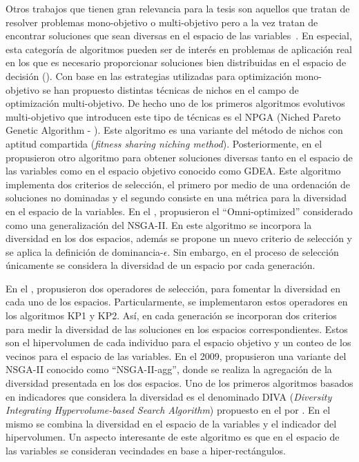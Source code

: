 Otros trabajos que tienen gran relevancia para la tesis son aquellos que tratan de resolver problemas mono-objetivo o multi-objetivo 
pero a la vez tratan de encontrar soluciones que sean diversas en el espacio de las variables~\cite{preuss2006pareto}.
%
En especial, esta categoría de algoritmos pueden ser de interés en problemas de aplicación real en los que es necesario 
proporcionar soluciones bien distribuidas en el espacio de decisión (\cite{deb2005omni, rudolph2007capabilities}).
%
Con base en las estrategias utilizadas para optimización mono-objetivo se han propuesto distintas técnicas de nichos en el 
campo de optimización multi-objetivo.
%
De hecho uno de los primeros algoritmos evolutivos multi-objetivo que introducen este tipo de técnicas es el NPGA 
(Niched Pareto Genetic Algorithm - \cite{Joel:NPGA}).
%
Este algoritmo es una variante del método de nichos con aptitud compartida (\textit{fitness sharing niching method}).
%
Posteriormente, \citeauthor{toffolo2003genetic} en el \citeyear{toffolo2003genetic} propusieron otro algoritmo para obtener 
soluciones diversas tanto en el espacio de las variables como en el espacio objetivo conocido como GDEA.
%
Este algoritmo implementa dos criterios de selección, el primero por medio de una ordenación de soluciones no dominadas y el 
segundo consiste en una métrica para la diversidad en el espacio de la variables.
%
En el \citeyear{deb2005omni}, \citeauthor{deb2005omni} propusieron el ``Omni-optimized'' considerado como una generalización 
del NSGA-II.
%
En este algoritmo se incorpora la diversidad en los dos espacios, además se propone un nuevo criterio de selección y se aplica 
la definición de dominancia-$\epsilon$.
%
Sin embargo, en el proceso de selección únicamente se considera la diversidad de un espacio por cada generación.


En el \citeyear{chan2005evolutionary}, \citeauthor{chan2005evolutionary} propusieron dos operadores de selección, para 
fomentar la diversidad en cada uno de los espacios.
%
Particularmente, se implementaron estos operadores en los algoritmos KP1 y KP2.
%
Así, en cada generación se incorporan dos criterios para medir la diversidad de las soluciones en los espacios correspondientes.
%
Estos son el hipervolumen de cada individuo para el espacio objetivo y un conteo de los vecinos para el espacio de las variables.
%
En el 2009, \citeauthor{shir2009enhancing} propusieron una variante del NSGA-II conocido como ``NSGA-II-agg'', donde se realiza 
la agregación de la diversidad presentada en los dos espacios.
%
Uno de los primeros algoritmos basados en indicadores que considera la diversidad es el denominado DIVA 
(\textit{Diversity Integrating Hypervolume-based Search Algorithm}) propuesto en el \citeyear{ulrich2010integrating} 
por \citeauthor{ulrich2010integrating}.
%
En el mismo se combina la diversidad en el espacio de la variables y el indicador del hipervolumen.
%
Un aspecto interesante de este algoritmo es que en el espacio de las variables se consideran vecindades en base a hiper-rectángulos.

